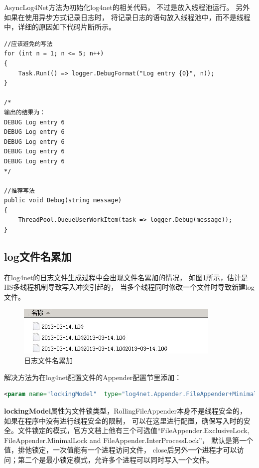 \documentclass{book}
\begin{document}
AsyncLog4Net方法为初始化log4net的相关代码，
不过是放入线程池运行。
另外如果在使用异步方式记录日志时，
将记录日志的语句放入线程池中，而不是线程中，详细的原因如下代码片断所示。

\begin{lstlisting}[language={[Sharp]C}]
//应该避免的写法
for (int n = 1; n <= 5; n++)
{
	Task.Run(() => logger.DebugFormat("Log entry {0}", n));
}

/*
输出的结果为：
DEBUG Log entry 6
DEBUG Log entry 6
DEBUG Log entry 6
DEBUG Log entry 6
DEBUG Log entry 6
*/

//推荐写法
public void Debug(string message)
{
	ThreadPool.QueueUserWorkItem(task => logger.Debug(message));
}
\end{lstlisting}


\subsection{log文件名累加}

在log4net的日志文件生成过程中会出现文件名累加的情况，
如图\ref{LogNameComplicate}所示，估计是IIS多线程机制导致写入冲突引起的，
当多个线程同时修改一个文件时导致新建log文件。

\begin{figure}[htbp]
	\centering
	\includegraphics[scale=0.8]{LogNameComplicate.jpg}
	\caption{日志文件名累加}
	\label{LogNameComplicate}
\end{figure}

解决方法为在log4net配置文件的Appender配置节里添加：

\begin{lstlisting}[language=XML]
<param name="lockingModel"  type="log4net.Appender.FileAppender+MinimalLock" />
\end{lstlisting}

\textbf{lockingModel}属性为文件锁类型，RollingFileAppender本身不是线程安全的，
如果在程序中没有进行线程安全的限制，
可以在这里进行配置，确保写入时的安全。文件锁定的模式，官方文档上他有三个可选值“FileAppender.ExclusiveLock, 
FileAppender.MinimalLock and FileAppender.InterProcessLock”，
默认是第一个值，排他锁定，一次值能有一个进程访问文件，
close后另外一个进程才可以访问；第二个是最小锁定模式，允许多个进程可以同时写入一个文件。
\end{document}
